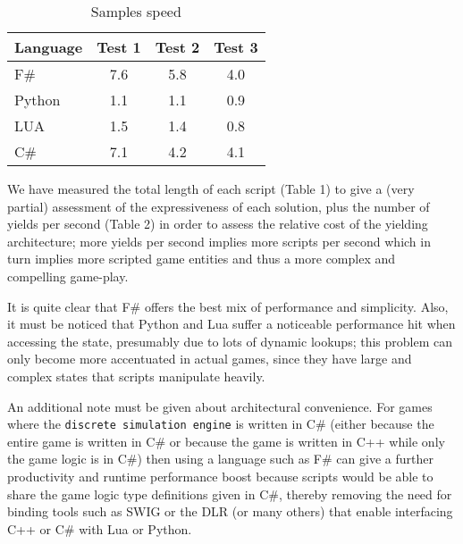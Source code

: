 \begin{table}[ht]
\caption{Samples speed}
\centering
\begin{tabular}{ l | c c c }
   Language & Test 1 & Test 2 & Test 3\\
   \hline
   F\# & 7.6 & 5.8 & 4.0 \\
   Python & 1.1 & 1.1 & 0.9 \\
   LUA & 1.5 & 1.4 & 0.8 \\
   C\# & 7.1 & 4.2 & 4.1\\
 \end{tabular}
\end{table}


We have measured the total length of each script (Table 1) to give a (very partial) assessment of the expressiveness of each solution, plus the number of yields per second (Table 2) in order to assess the relative cost of the yielding architecture; more yields per second implies more scripts per second which in turn implies more scripted game entities and thus a more complex and compelling game-play.

It is quite clear that F\# offers the best mix of performance and simplicity. Also, it must be noticed that Python and Lua suffer a noticeable performance hit when accessing the state, presumably due to lots of dynamic lookups; this problem can only become more accentuated in actual games, since they have large and complex states that scripts manipulate heavily.

An additional note must be given about architectural convenience. For games where the \texttt{discrete simulation engine} is written in C\# (either because the entire game is written in C\# or because the game is written in C++ while only the game logic is in C\#) then using a language such as F\# can give a further productivity and runtime performance boost because scripts would be able to share the game logic type definitions given in C\#, thereby removing the need for binding tools such as SWIG or the DLR \cite{SWIG,DLR} (or many others) that enable interfacing C++ or C\# with Lua or Python.
